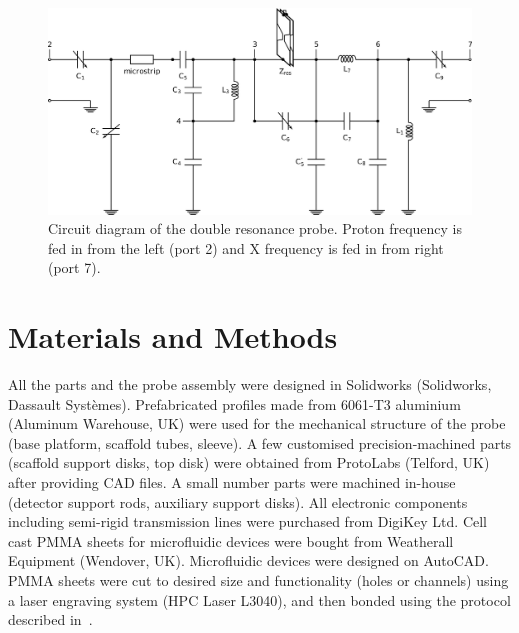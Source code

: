 \documentclass[preprint,5p]{elsarticle}
\begin{document}
\begin{figure}
\centering
\includegraphics[width=.8\linewidth,keepaspectratio=true]{./figures/ms5n17-tlp-im-180110-circuit-diagram.png}
\caption{Circuit diagram of the double resonance probe. 
Proton frequency is fed in from the left (port 2) and X frequency is fed in from right (port 7).
}
\label{fig:circuit}
\end{figure}
\section{Materials and Methods}
All the parts and the probe assembly were designed in Solidworks (Solidworks, Dassault Syst\`{e}mes). 
Prefabricated profiles made from 6061-T3 aluminium (Aluminum Warehouse, UK) were used for the
 mechanical structure of the probe
(base platform, scaffold tubes, sleeve). 
A few customised precision-machined parts (scaffold support disks, top disk) were obtained from 
ProtoLabs (Telford, UK) after providing CAD files. A small number parts were machined in-house
 (detector support rods, auxiliary support disks). 
 All  electronic components including semi-rigid transmission lines were purchased from DigiKey Ltd. 
 Cell cast PMMA sheets for microfluidic devices were bought from Weatherall Equipment (Wendover, UK). Microfluidic 
devices were designed on AutoCAD. PMMA sheets were cut to desired size and functionality (holes or channels) using a 
laser engraving system  (HPC Laser L3040), 
and then bonded using the protocol described in~\cite{yilmaz_bonding}.
\end{document}

